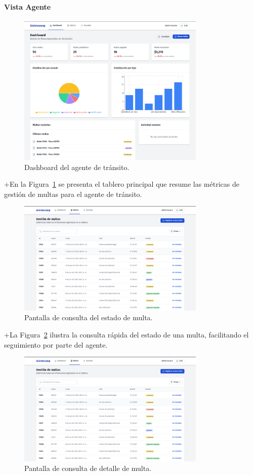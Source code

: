 \paragraph{Vista Agente}
\begin{figure}[htbp]
    \centering
    \includegraphics[width=0.8\textwidth]{Images/UI3.png}
    \caption{Dashboard del agente de tránsito.}
    \label{fig:dashboard_agente}
\end{figure}
+En la Figura~\ref{fig:dashboard_agente} se presenta el tablero principal que resume las métricas de gestión de multas para el agente de tránsito.
\begin{figure}[htbp]
    \centering
    \includegraphics[width=0.8\textwidth]{Images/UI4.png}
    \caption{Pantalla de consulta del estado de multa.}
    \label{fig:consulta_estado_multa}
\end{figure}
+La Figura~\ref{fig:consulta_estado_multa} ilustra la consulta rápida del estado de una multa, facilitando el seguimiento por parte del agente.
\begin{figure}[htbp]
    \centering
    \includegraphics[width=0.8\textwidth]{Images/UI4.png}
    \caption{Pantalla de consulta de detalle de multa.}
    \label{fig:consulta_detalle_multa}
\end{figure}
